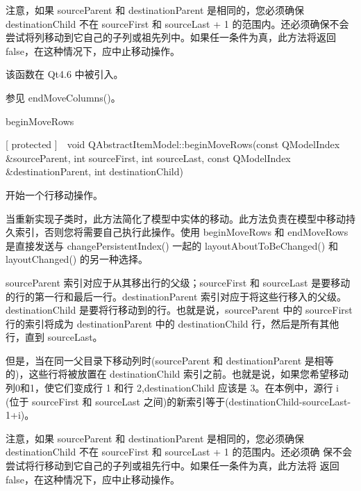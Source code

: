 注意，如果 sourceParent 和 destinationParent 是相同的，您必须确保 destinationChild 不在 sourceFirst 和 sourceLast + 1 的范围内。还必须确保不会尝试将列移动到它自己的子列或祖先列中。如果任一条件为真，此方法将返回 false，在这种情况下，应中止移动操作。

该函数在 Qt4.6 中被引入。

参见 endMoveColumns()。

\splitLine

beginMoveRows

[ protected ] void QAbstractItemModel::beginMoveRows(const QModelIndex \&sourceParent, int sourceFirst, int sourceLast, const QModelIndex \&destinationParent, int destinationChild)

开始一个行移动操作。

当重新实现子类时，此方法简化了模型中实体的移动。此方法负责在模型中移动持久索引，否则您将需要自己执行此操作。使用 beginMoveRows 和 endMoveRows 是直接发送与 changePersistentIndex() 一起的 layoutAboutToBeChanged() 和 layoutChanged() 的另一种选择。

sourceParent 索引对应于从其移出行的父级；sourceFirst 和 sourceLast 是要移动的行的第一行和最后一行。destinationParent 索引对应于将这些行移入的父级。destinationChild 是要将行移动到的行。也就是说，sourceParent 中的 sourceFirst 行的索引将成为 destinationParent 中的 destinationChild 行，然后是所有其他行，直到 sourceLast。

但是，当在同一父目录下移动列时(sourceParent 和 destinationParent 是相等的)，这些行将被放置在 destinationChild 索引之前。也就是说，如果您希望移动列0和1，使它们变成行 1 和行 2,destinationChild 应该是 3。在本例中，源行 i (位于 sourceFirst 和 sourceLast 之间)的新索引等于(destinationChild-sourceLast-1+i)。

注意，如果 sourceParent 和 destinationParent 是相同的，您必须确保
destinationChild 不在 sourceFirst 和 sourceLast + 1 的范围内。还必须确
保不会尝试将行移动到它自己的子列或祖先行中。如果任一条件为真，此方法将
返回 false，在这种情况下，应中止移动操作。

